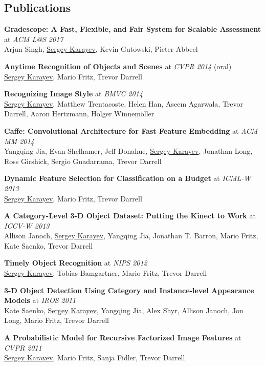 \documentclass[line, margin]{res}
\begin{document}
\begin{resume}

\section{\sc Publications}

\textbf{Gradescope: A Fast, Flexible, and Fair System for Scalable Assessment} at \emph{ACM L@S 2017}\\
Arjun Singh, \underline{Sergey Karayev}, Kevin Gutowski, Pieter Abbeel

\textbf{Anytime Recognition of Objects and Scenes} at \emph{CVPR 2014} (oral)\\
\underline{Sergey Karayev}, Mario Fritz, Trevor Darrell

\textbf{Recognizing Image Style} at \emph{BMVC 2014}\\
\underline{Sergey Karayev}, Matthew Trentacoste, Helen Han, Aseem Agarwala, Trevor Darrell, Aaron Hertzmann, Holger Winnem\"{o}ller

\textbf{Caffe: Convolutional Architecture for Fast Feature Embedding} at \emph{ACM MM 2014}\\
Yangqing Jia, Evan Shelhamer, Jeff Donahue, \underline{Sergey Karayev},
Jonathan Long, Ross Girshick, Sergio Guadarrama, Trevor Darrell

\textbf{Dynamic Feature Selection for Classification on a Budget} at \emph{ICML-W 2013}\\
\underline{Sergey Karayev}, Mario Fritz, Trevor Darrell

\textbf{A Category-Level 3-D Object Dataset: Putting the Kinect to Work} at \emph{ICCV-W 2013}\\
Allison Janoch, \underline{Sergey Karayev}, Yangqing Jia, Jonathan T. Barron, Mario Fritz, Kate Saenko, Trevor Darrell

\textbf{Timely Object Recognition} at \emph{NIPS 2012}\\
\underline{Sergey Karayev}, Tobias Bamgartner, Mario Fritz, Trevor Darrell

\textbf{3-D Object Detection Using Category and Instance-level Appearance Models} at \emph{IROS 2011}\\
Kate Saenko, \underline{Sergey Karayev}, Yangqing Jia, Alex Shyr, Allison Janoch, Jon Long, Mario Fritz, Trevor Darrell

\textbf{A Probabilistic Model for Recursive Factorized Image Features} at \emph{CVPR 2011}\\
\underline{Sergey Karayev}, Mario Fritz, Sanja Fidler, Trevor Darrell


\end{resume}
\end{document}
